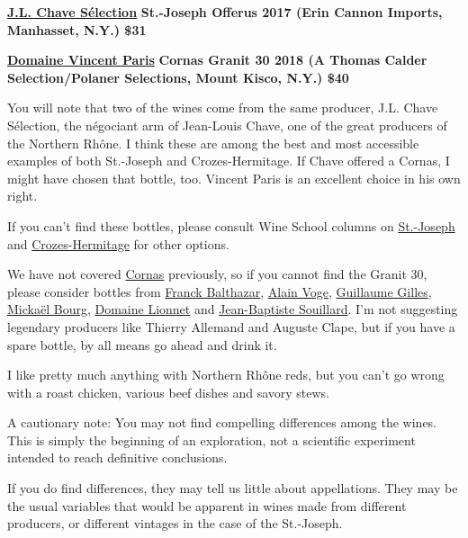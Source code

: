 \href{http://grandcruselections.com/jean-louis-chave-selections}{\textbf{J.L.
Chave Sélection}} \textbf{St.-Joseph Offerus 2017 (Erin Cannon Imports,
Manhasset, N.Y.) \$31}

\href{https://www.polanerselections.com/producer/vincent-paris}{\textbf{Domaine
Vincent Paris}} \textbf{Cornas Granit 30 2018 (A Thomas Calder
Selection/Polaner Selections, Mount Kisco, N.Y.) \$40}

You will note that two of the wines come from the same producer, J.L.
Chave Sélection, the négociant arm of Jean-Louis Chave, one of the great
producers of the Northern Rhône. I think these are among the best and
most accessible examples of both St.-Joseph and Crozes-Hermitage. If
Chave offered a Cornas, I might have chosen that bottle, too. Vincent
Paris is an excellent choice in his own right.

If you can't find these bottles, please consult Wine School columns on
\href{https://www.nytimes3xbfgragh.onion/2015/01/07/dining/wine-school-st-joseph.html}{St.-Joseph}
and
\href{https://www.nytimes3xbfgragh.onion/2017/09/28/dining/wine-school-assignment-crozes-hermitage.html}{Crozes-Hermitage}
for other options.

We have not covered
\href{https://www.nytimes3xbfgragh.onion/2014/10/01/dining/cornas-reds-rated-by-the-wine-panel.html}{Cornas}
previously, so if you cannot find the Granit 30, please consider bottles
from
\href{http://saviosoaresselections.com/domaine-franck-balthazar}{Franck
Balthazar}, \href{https://www.alain-voge.com/en/}{Alain Voge},
\href{https://madrose.com/producers/france/cotes-du-rhone-north/domaine-guillaume-gilles/}{Guillaume
Gilles},
\href{https://www.winemc2.com/portfolio/domaine-mickael-bourg/}{Mickaël
Bourg},
\href{https://madrose.com/producers/france/cotes-du-rhone-north/domaine-lionnet/}{Domaine
Lionnet} and
\href{https://www.beckywasserman.com/domaines/jean-baptiste-souillard/\#.X0u6XtNKiCc}{Jean-Baptiste
Souillard}. I'm not suggesting legendary producers like Thierry Allemand
and Auguste Clape, but if you have a spare bottle, by all means go ahead
and drink it.

I like pretty much anything with Northern Rhône reds, but you can't go
wrong with a roast chicken, various beef dishes and savory stews.

A cautionary note: You may not find compelling differences among the
wines. This is simply the beginning of an exploration, not a scientific
experiment intended to reach definitive conclusions.

If you do find differences, they may tell us little about appellations.
They may be the usual variables that would be apparent in wines made
from different producers, or different vintages in the case of the
St.-Joseph.

